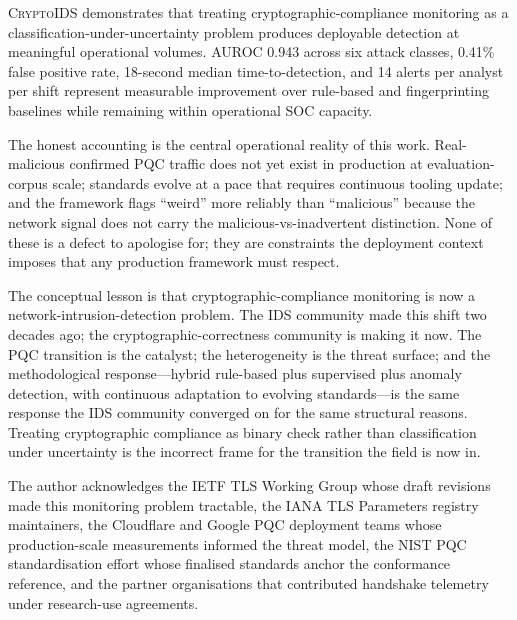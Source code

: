 \documentclass[sigconf,nonacm]{acmart}
\begin{document}
\textsc{CryptoIDS} demonstrates that treating
cryptographic-compliance monitoring as a classification-under-uncertainty
problem produces deployable detection at meaningful operational
volumes. AUROC 0.943 across six attack classes, 0.41\% false
positive rate, 18-second median time-to-detection, and 14
alerts per analyst per shift represent measurable improvement
over rule-based and fingerprinting baselines while remaining
within operational SOC capacity.

The honest accounting is the central operational reality of
this work. Real-malicious confirmed PQC traffic does not yet
exist in production at evaluation-corpus scale; standards
evolve at a pace that requires continuous tooling update; and
the framework flags ``weird'' more reliably than ``malicious''
because the network signal does not carry the malicious-vs-inadvertent
distinction. None of these is a defect to apologise for; they
are constraints the deployment context imposes that any
production framework must respect.

The conceptual lesson is that cryptographic-compliance monitoring
is now a network-intrusion-detection problem. The IDS community
made this shift two decades ago; the cryptographic-correctness
community is making it now. The PQC transition is the catalyst;
the heterogeneity is the threat surface; and the methodological
response---hybrid rule-based plus supervised plus anomaly
detection, with continuous adaptation to evolving standards---is
the same response the IDS community converged on for the same
structural reasons. Treating cryptographic compliance as binary
check rather than classification under uncertainty is the
incorrect frame for the transition the field is now in.

\begin{acks}
The author acknowledges the IETF TLS Working Group whose draft
revisions made this monitoring problem tractable, the IANA TLS
Parameters registry maintainers, the Cloudflare and Google PQC
deployment teams whose production-scale measurements informed
the threat model, the NIST PQC standardisation effort whose
finalised standards anchor the conformance reference, and the
partner organisations that contributed handshake telemetry under
research-use agreements.
\end{acks}
\end{document}
